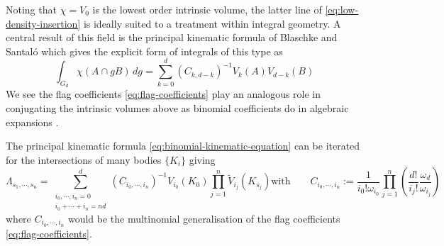 Noting that $\chi = V_0$ is the lowest order intrinsic volume, the latter line of \eqref{eq:low-density-insertion} is ideally suited to a treatment within integral geometry.
A central result of this field is the principal kinematic formula of Blaschke and Santal\'o \cite{BlaschkeMZ1936,Blaschke1937,SantaloASI1936} which gives the explicit form of integrals of this type as \cite{Santalo2004,Klain1997}
\begin{equation}\label{eq:binomial-kinematic-equation}
  \int_{G_d} \chi(A \cap gB) \, dg
  =
  \sum_{k=0}^d (C_{k,d-k})^{-1} V_k(A) V_{d-k}(B)
\end{equation}
We see the flag coefficients \eqref{eq:flag-coefficients} play an analogous role in conjugating the intrinsic volumes above as binomial coefficients do in algebraic expansions \cite{Klain1997}.

The principal kinematic formula \eqref{eq:binomial-kinematic-equation} can be iterated for the intersections of many bodies $\{K_i\}$ giving \cite{Santalo2004,MarechalPRE2014}
\begin{subequations}\label{eq:multinomial-kinematic-equation}
  \begin{equation}
    \Lambda_{s_1, \cdots, s_n}
    =
      \sum_{\substack{i_0, \cdots, i_n = 0 \\ i_0 + \cdots + i_n = nd}}^d
      (C_{i_0, \cdots, i_n})^{-1}
      V_{i_0}(K_0)
      \prod_{j=1}^n
      \widetilde{V}_{i_j}(K_{s_j})
  \end{equation}
  \begin{equation}
    \textrm{with} \qquad
    C_{i_0, \cdots, i_n}
    := \frac{1}{i_0! \omega_{i_0}}
    \prod_{j=1}^n
    \left(
    \frac{d!}{i_j!} \frac{\omega_d}{\omega_{i_j}}
    \right)
  \end{equation}
\end{subequations}
where $C_{i_0, \cdots, i_n}$ would be the multinomial generalisation of the flag coefficients \eqref{eq:flag-coefficients}.
